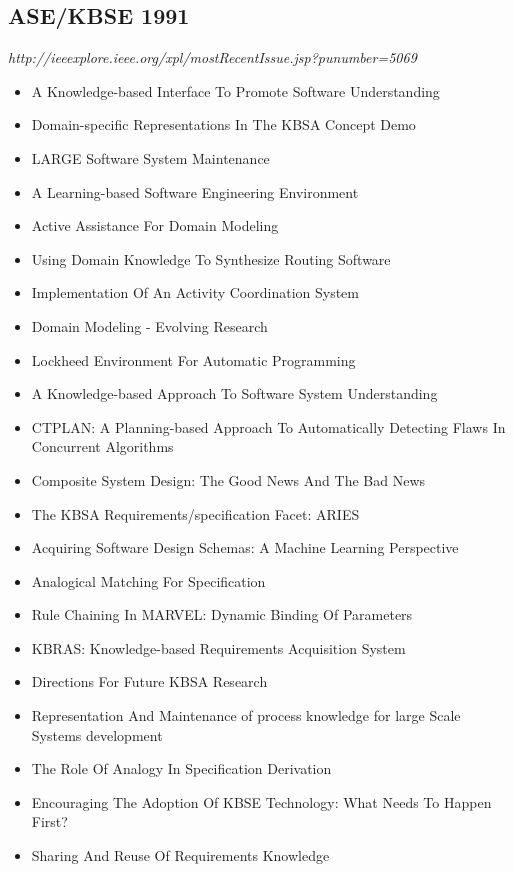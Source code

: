 \subsection{ASE/KBSE 1991}

{\small \em http://ieeexplore.ieee.org/xpl/mostRecentIssue.jsp?punumber=5069}

{\small
\begin{itemize}[itemsep=-1ex]
  \item A Knowledge-based Interface To Promote Software Understanding
  \item Domain-specific Representations In The KBSA Concept Demo
  \item LARGE Software System Maintenance
  \item A Learning-based Software Engineering Environment
  \item Active Assistance For Domain Modeling
  \item Using Domain Knowledge To Synthesize Routing Software
  \item Implementation Of An Activity Coordination System
  \item Domain Modeling - Evolving Research
  \item Lockheed Environment For Automatic Programming
  \item A Knowledge-based Approach To Software System Understanding
  \item CTPLAN: A Planning-based Approach To Automatically Detecting Flaws In Concurrent Algorithms
  \item Composite System Design: The Good News And The Bad News
  \item The KBSA Requirements/specification Facet: ARIES
  \item Acquiring Software Design Schemas: A Machine Learning Perspective
  \item Analogical Matching For Specification
  \item Rule Chaining In MARVEL: Dynamic Binding Of Parameters
  \item KBRAS: Knowledge-based Requirements Acquisition System
  \item Directions For Future KBSA Research
  \item Representation And Maintenance of process knowledge for large Scale Systems development
  \item The Role Of Analogy In Specification Derivation
  \item Encouraging The Adoption Of KBSE Technology: What Needs To Happen First?
  \item Sharing And Reuse Of Requirements Knowledge

\end{itemize}}
